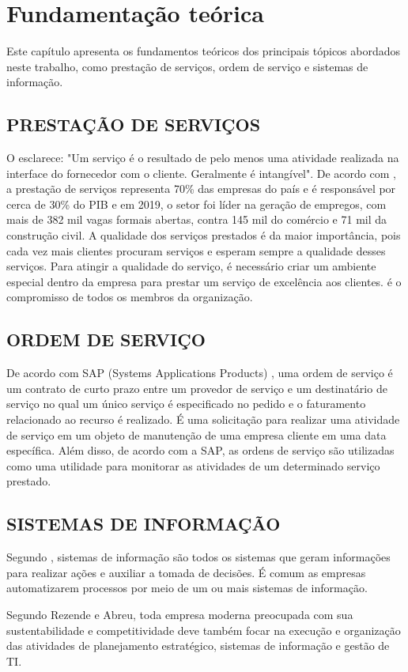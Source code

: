\chapter{Fundamentação teórica}
Este capítulo apresenta os fundamentos teóricos dos principais tópicos abordados neste trabalho, como prestação de serviços, ordem de serviço e sistemas de informação.
\section{PRESTAÇÃO DE SERVIÇOS}
O  esclarece: "Um serviço é o resultado de pelo menos uma atividade realizada na interface do fornecedor com o cliente. Geralmente é intangível".
De acordo com ,
a prestação de serviços representa 70\% das empresas do país e é responsável por cerca de 30\% do PIB e em 2019, o setor foi líder na geração de empregos, com mais de 382 mil vagas formais abertas, contra 145 mil do comércio e 71 mil da construção civil.
A qualidade dos serviços prestados é da maior importância, pois cada vez mais clientes procuram serviços e esperam sempre a qualidade desses serviços. Para atingir a qualidade do serviço, é necessário criar um ambiente especial dentro da empresa para prestar um serviço de excelência aos clientes. é o compromisso de todos os membros da organização. \cite{SENAC}

\section{ORDEM DE SERVIÇO}
De acordo com SAP (Systems Applications Products) \cite{douglas_da_silva_2020}, uma ordem de serviço é um contrato de curto prazo entre um provedor de serviço e um destinatário de serviço no qual um único serviço é especificado no pedido e o faturamento relacionado ao recurso é realizado. É uma solicitação para realizar uma atividade de serviço em um objeto de manutenção de uma empresa cliente em uma data específica. Além disso, de acordo com a SAP, as ordens de serviço são utilizadas como uma utilidade para monitorar as atividades de um determinado serviço prestado.

\section{SISTEMAS DE INFORMAÇÃO}
Segundo , sistemas de informação são todos os sistemas que geram informações para realizar ações e auxiliar a tomada de decisões. É comum as empresas automatizarem processos por meio de um ou mais sistemas de informação.

Segundo Rezende e Abreu, toda empresa moderna preocupada com sua sustentabilidade e competitividade deve também focar na execução e organização das atividades de planejamento estratégico, sistemas de informação e gestão de TI.
